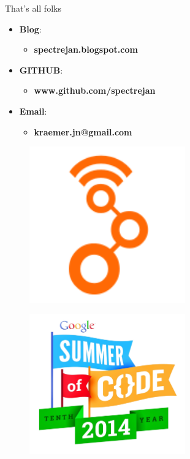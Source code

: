 \documentclass[18pt]{beamer}
\begin{document}
\begin{frame}{That's all folks}
	\begin{minipage}[t]{0.6\textwidth} 
	\begin{itemize}
	\item \textbf{Blog}:
	\begin{itemize}
	\item[]\textbf{spectrejan.blogspot.com}
	\end{itemize}
	\item \textbf{GITHUB}:
	\begin{itemize}
	\item[] \textbf{www.github.com/spectrejan}
	\end{itemize}
	\item \textbf{Email}:
	\begin{itemize}
	\item[] \textbf{kraemer.jn@gmail.com}
	\end{itemize}
	\end{itemize}
	\end{minipage}
	\begin{minipage}[t]{0.35\textwidth}
	\begin{minipage}[t]{1\textwidth}
	\begin{figure}[htbp]
	\includegraphics[width=0.6\textwidth]{logos/GR}
	\end{figure} 
	\end{minipage}
	\begin{minipage}[t]{1\textwidth}
	\begin{figure}[htbp]
	\includegraphics[width=0.6\textwidth]{logos/GSOC}

\end{figure}
\end{minipage}
\end{minipage}
\end{frame}
\end{document}
